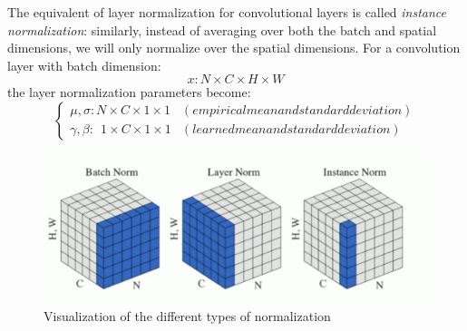The equivalent of layer normalization for convolutional layers is called \emph{instance normalization}: similarly, instead of averaging over both the batch and spatial dimensions, we will only normalize over the spatial dimensions. For a convolution layer with batch dimension:
\begin{equation*}
    x: N\times C\times H\times W
\end{equation*}
the layer normalization parameters become:
\begin{equation*}
    \begin{cases*}
        \mu, \sigma: N\times C\times 1\times 1 & (empirical mean and standard deviation)\\
        \gamma, \beta: \;\,1\times C\times 1\times 1 & (learned mean and standard deviation)
    \end{cases*}
\end{equation*}

\begin{figure}[H]
    \centering
    \includegraphics[width=.7\textwidth]{images/normalization-types.png}
    \caption{Visualization of the different types of normalization}
\end{figure}